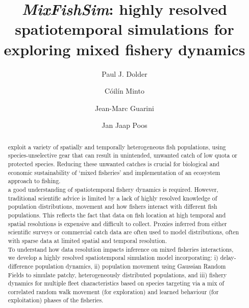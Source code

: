 \documentclass[review]{elsarticle}
\begin{document}
\begin{frontmatter}
\title{\emph{MixFishSim}: highly resolved spatiotemporal simulations for
	exploring mixed fishery dynamics}

\author[1,2]{Paul J. Dolder}

\author[1]{Cóilín Minto}
\author[3]{Jean-Marc Guarini}
\author[4]{Jan Jaap Poos}

\address[1]{Galway-Mayo Institute of Technology (GMIT), Dublin Road, Galway,
	Ireland} 
\address[2]{Centre for Environment, Fisheries and Aquaculture Science (Cefas),
	Pakefield Road, Lowestoft, UK}
\address[3]{, 4 Place Jussieu,
	75005 Paris, France}
\address[4]{Wageningen Marine Research, Haringkade 1 1976 CP IJmuiden,
	Netherlands}

\begin{abstract}

 exploit a variety 
of spatially and temporally heterogeneous fish populations, using
species-unselective gear that can result in unintended, unwanted catch of low
quota or protected species. Reducing these unwanted catches is crucial for
biological and economic sustainability of `mixed fisheries' and implementation
of an ecosystem approach to fishing. \\

 a good understanding of
spatiotemporal fishery dynamics is required. However, traditional scientific
advice is limited by a lack of highly resolved knowledge of population
distributions, movement and how fishers interact with different fish
populations. This reflects the fact that data on fish location at high temporal
and spatial resolutions is expensive and difficult to collect. Proxies inferred
from either scientific surveys or commercial catch data are often used to model
distributions, often with sparse data at limited spatial and temporal
resolution. \\ 

To understand how data resolution impacts inference on mixed fisheries
interactions, we develop a highly resolved spatiotemporal simulation model
incorporating: i) delay-difference population dynamics, ii) population movement
using Gaussian Random Fields to simulate patchy, heterogeneously distributed
populations, and iii) fishery dynamics for multiple fleet characteristics based
on species targeting via a mix of correlated random walk movement (for
exploration) and learned behaviour (for exploitation) phases of the fisheries.
\\ 


\end{abstract}
\end{frontmatter}
\end{document}
